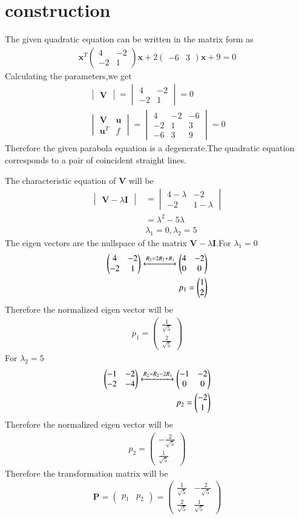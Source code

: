 \documentclass[journal,12pt,twocolumn]{IEEEtran}
\newcommand{\myvec}[1]{\ensuremath{\begin{pmatrix}#1\end{pmatrix}}}
\newcommand{\mydet}[1]{\ensuremath{\begin{vmatrix}#1\end{vmatrix}}}
\numberwithin{equation}{subsection}
\let\vec\mathbf
\begin{document}
\section{construction}
The given quadratic equation can be written in the matrix form as
\begin{align}
    \vec{x}^T\myvec{4&-2\\-2&1}\vec{x}+2\myvec{-6&3}\vec{x}+9=0\label{eq:1}
\end{align}
Calculating the parameters,we get
\begin{align}
    \mydet{\vec{V}}=\mydet{4&-2\\-2&1}=0\\
    \mydet{\vec{V}&\vec{u}\\\vec{u}^T&f}=\mydet{4&-2&-6\\-2&1&3\\-6&3&9}=0
\end{align}
Therefore the given parabola equation is a degenerate.The quadratic equation corresponds to a pair of coincident straight lines.\par
The characteristic equation of $\vec{V}$ will be
\begin{align}
    \mydet{\vec{V}-\lambda\vec{I}}&=\mydet{4-\lambda&-2\\-2&1-\lambda}\\
    &=\lambda^2-5\lambda\\
    &\lambda_1=0,\lambda_2=5
\end{align}
The eigen vectors are the nullspace of the matrix $\vec{V}-\lambda\vec{I}$.For $\lambda_1=0$
\begin{align}
    \myvec{4&-2\\-2&1}\xleftrightarrow{R_2=2R_2+R_1}\myvec{4&-2\\0&0}\\
    p_1=\myvec{1\\2}
\end{align}
Therefore the normalized eigen vector will be
\begin{align}
    p_1=\myvec{\frac{1}{\sqrt{5}}\\\frac{2}{\sqrt{5}}}
\end{align}
For $\lambda_2=5$
\begin{align}
    \myvec{-1&-2\\-2&-4}\xleftrightarrow{R_2=R_2-2R_1}\myvec{-1&-2\\0&0}\\
    p_2=\myvec{-2\\1}
\end{align}
Therefore the normalized eigen vector will be
\begin{align}
    p_2=\myvec{-\frac{2}{\sqrt{5}}\\\frac{1}{\sqrt{5}}}
\end{align}
Therefore the transformation matrix will be
\begin{align}
    \vec{P}=\myvec{p_1&p_2}=\myvec{\frac{1}{\sqrt{5}}&-\frac{2}{\sqrt{5}}\\\frac{2}{\sqrt{5}}&\frac{1}{\sqrt{5}}}
\end{align}
\end{document}
